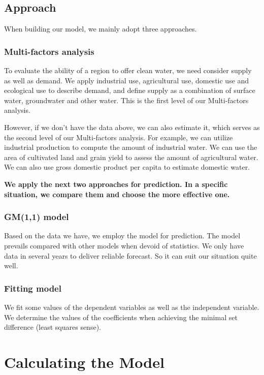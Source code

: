\documentclass{mcmthesis}
\begin{document}
\subsection{Approach}
\par When building our model, we mainly adopt three approaches.
 
\subsubsection{Multi-factors analysis}
\par To evaluate the ability of a region to offer clean water, we need consider supply as well as demand. We apply industrial use, agricultural use, domestic use and ecological use to describe demand, and define supply as a combination of surface water, groundwater and other water. This is the first level of our Multi-factors analysis.
\par However, if we don’t have the data above, we can also estimate it, which serves as the second level of our Multi-factors analysis. For example, we can utilize industrial production to compute the amount of industrial water. We can use the area of cultivated land and grain yield to assess the amount of agricultural water. We can also use gross domestic product per capita to estimate domestic water.

\textbf{We apply the next two approaches for prediction. In a specific situation, we compare them and choose the more effective one. }

\subsubsection{GM(1,1) model}
\par Based on the data we have, we employ the model for prediction. The model prevails compared with other models when devoid of statistics. We only have data in several years to deliver reliable forecast. So it can suit our situation quite well.

\subsubsection{Fitting model}
\par We fit some values of the dependent variables as well as the independent variable. We determine the values of the coefficients when achieving the minimal set difference (least squares sense).


\section{Calculating the Model}
\end{document}
